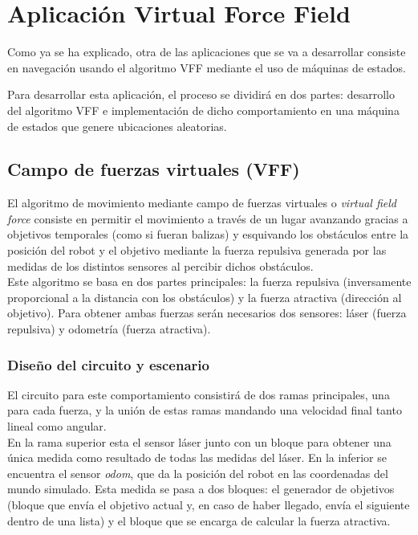 \chapter{Aplicación Virtual Force Field}
\label{cap:capitulo6}
Como ya se ha explicado, otra de las aplicaciones que se va a desarrollar consiste en navegación usando el algoritmo VFF mediante el uso de máquinas de estados.

Para desarrollar esta aplicación, el proceso se dividirá en dos partes: desarrollo del algoritmo VFF e implementación de dicho comportamiento
en una máquina de estados que genere ubicaciones aleatorias.

\section{Campo de fuerzas virtuales (VFF)}
\label{sec:VFF}

El algoritmo de movimiento mediante campo de fuerzas virtuales o \textit{virtual field force} consiste en permitir el movimiento a través de un lugar avanzando gracias a
objetivos temporales (como si fueran balizas) y esquivando los obstáculos entre la posición del robot y el objetivo mediante la fuerza repulsiva generada por las medidas
de los distintos sensores al percibir dichos obstáculos.\\

Este algoritmo se basa en dos partes principales: la fuerza repulsiva (inversamente proporcional a la distancia con los obstáculos) y la
fuerza atractiva (dirección al objetivo). Para obtener ambas fuerzas serán necesarios dos sensores: láser (fuerza repulsiva) y odometría (fuerza atractiva).\\

\subsection{Diseño del circuito y escenario}
\label{subsec:dis_bloques_VFF}

El circuito para este comportamiento consistirá de dos ramas principales, una para cada fuerza, y la unión de estas ramas mandando una velocidad final tanto lineal como angular.\\

En la rama superior esta el sensor láser junto con un bloque para obtener una única medida como resultado de todas las medidas del láser. En la inferior se encuentra el sensor
\textit{odom}, que da la posición del robot en las coordenadas del mundo simulado.
Esta medida se pasa a dos bloques: el generador de objetivos (bloque que envía el objetivo actual
y, en caso de haber llegado, envía el siguiente dentro de una lista) y el bloque que se encarga de calcular la fuerza atractiva.

